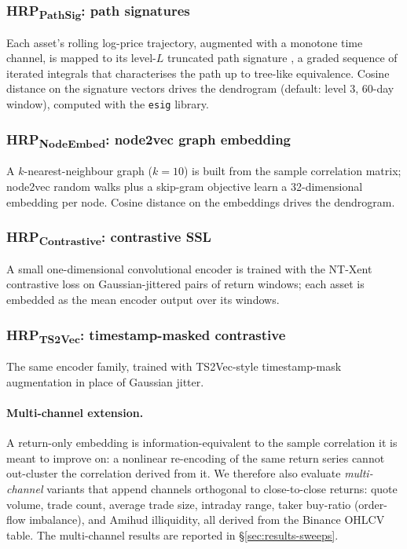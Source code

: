 \documentclass[11pt,a4paper]{article}
\begin{document}
\subsubsection{HRP\textsubscript{PathSig}: path signatures}
Each asset's rolling log-price trajectory, augmented with a monotone time
channel, is mapped to its level-$L$ truncated path signature
\citep{lyons1998}, a graded sequence of iterated integrals that
characterises the path up to tree-like equivalence. Cosine distance on
the signature vectors drives the dendrogram (default: level 3, 60-day
window), computed with the \texttt{esig} library.

\subsubsection{HRP\textsubscript{NodeEmbed}: node2vec graph embedding}
A $k$-nearest-neighbour graph ($k=10$) is built from the sample
correlation matrix; node2vec random walks plus a skip-gram objective
\citep{grover2016} learn a 32-dimensional embedding per node. Cosine
distance on the embeddings drives the dendrogram.

\subsubsection{HRP\textsubscript{Contrastive}: contrastive SSL}
A small one-dimensional convolutional encoder is trained with the NT-Xent
contrastive loss \citep{chen2020} on Gaussian-jittered pairs of return
windows; each asset is embedded as the mean encoder output over its
windows.

\subsubsection{HRP\textsubscript{TS2Vec}: timestamp-masked contrastive}
The same encoder family, trained with TS2Vec-style timestamp-mask
augmentation \citep{yue2022} in place of Gaussian jitter.

\paragraph{Multi-channel extension.} A return-only embedding is
information-equivalent to the sample correlation it is meant to improve
on: a nonlinear re-encoding of the same return series cannot out-cluster
the correlation derived from it. We therefore also evaluate
\emph{multi-channel} variants that append channels orthogonal to
close-to-close returns: quote volume, trade count, average trade size,
intraday range, taker buy-ratio (order-flow imbalance), and Amihud
illiquidity, all derived from the Binance OHLCV table. The multi-channel
results are reported in \S\ref{sec:results-sweeps}.
\end{document}
